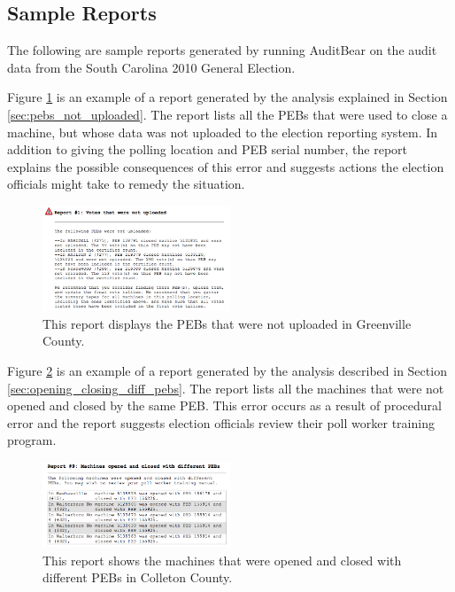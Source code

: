 \subsection{Sample Reports}
The following are sample reports generated by running AuditBear on the
audit data from the South Carolina 2010 General Election. 

Figure
\ref{fig:sample2} is an example of a report generated by the analysis
explained in Section \ref{sec:pebs_not_uploaded}. The report lists all
the PEBs that were used to close a machine, but whose data was not
uploaded to the election reporting 
system. In addition to giving the polling location and PEB serial
number, the report explains the possible consequences of this
error and suggests actions the election officials might take to
remedy the situation.

\begin{figure}[h!]
  \caption{This report displays the PEBs that were not uploaded in Greenville County.}
  \label{fig:sample2}
  \centering
    \includegraphics[width=0.5\textwidth]{sample3}
\end{figure}

Figure \ref{fig:sample3} is an example of a report generated by the
analysis described in Section \ref{sec:opening_closing_diff_pebs}. The
report lists all the machines that were not opened and closed by the
same PEB. This error occurs as a result of procedural error and the
report suggests election officials review their poll worker training
program.

\begin{figure}[h!]
  \caption{This report shows the machines that were opened and closed with different PEBs in Colleton County.}
  \label{fig:sample3}
  \centering
    \includegraphics[width=0.5\textwidth]{sample2}
\end{figure}
